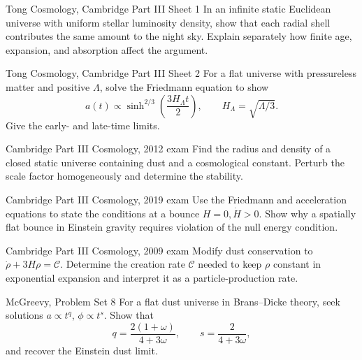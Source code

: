 \begin{exercises}

\begin{exercise}{Tong Cosmology, Cambridge Part III Sheet 1}
In an infinite static Euclidean universe with uniform stellar luminosity
density, show that each radial shell contributes the same amount to the night
sky.  Explain separately how finite age, expansion, and absorption affect the
argument.
\end{exercise}

\begin{exercise}{Tong Cosmology, Cambridge Part III Sheet 2}
For a flat universe with pressureless matter and positive \(\Lambda\), solve
the Friedmann equation to show
\[
a(t)\propto\sinh^{2/3}\left(\frac{3H_\Lambda t}{2}\right),
\qquad H_\Lambda=\sqrt{\Lambda/3}.
\]
Give the early- and late-time limits.
\end{exercise}

\begin{exercise}{Cambridge Part III Cosmology, 2012 exam}
Find the radius and density of a closed static universe containing dust and a
cosmological constant.  Perturb the scale factor homogeneously and determine
the stability.
\end{exercise}

\begin{exercise}{Cambridge Part III Cosmology, 2019 exam}
Use the Friedmann and acceleration equations to state the conditions at a
bounce \(H=0,\dot H>0\).  Show why a spatially flat bounce in Einstein gravity
requires violation of the null energy condition.
\end{exercise}

\begin{exercise}{Cambridge Part III Cosmology, 2009 exam}
Modify dust conservation to
\(\dot\rho+3H\rho=\mathcal C\).  Determine the creation rate
\(\mathcal C\) needed to keep \(\rho\) constant in exponential expansion and
interpret it as a particle-production rate.
\end{exercise}

\begin{exercise}{McGreevy, Problem Set 8}
For a flat dust universe in Brans--Dicke theory, seek solutions
\(a\propto t^q\), \(\phi\propto t^s\).  Show that
\[
q=\frac{2(1+\omega)}{4+3\omega},
\qquad
s=\frac{2}{4+3\omega},
\]
and recover the Einstein dust limit.
\end{exercise}


\end{exercises}
